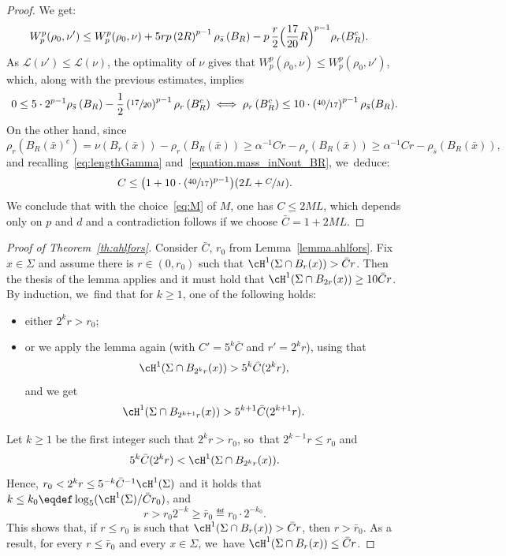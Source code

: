 \begin{proof}
We get:
\begin{align*}
W_p^p(\rho_0, \nu')
&\le
W_p^p(\rho_0, \nu)
+
5rp
\left(2R\right)^{p-1}\rho_{\bar s}\left(B_R\right)
-
p\,\frac{r}{2}
\Bigl(\frac{17}{20}R\Bigr)^{p-1}\rho_r(B_R^c).
\end{align*}
As $\mathcal{L}(\nu') \le \mathcal{L}(\nu)$, the optimality of $\nu$ gives that $W_p^p(\rho_0, \nu) \le W_p^p(\rho_0, \nu')$, which, along with the previous estimates, implies
\[
0 \le
5\cdot
2^{p-1}\rho_{\bar s}\left(B_R\right)
-
\frac{1}{2}
\left(\sfrac{17}{20}\right)^{p-1}\rho_r\left(B_R^c\right)
\iff
\rho_r\left(B_R^c\right)\le 10\cdot \left(\sfrac{40}{17}\right)^{p-1}
\rho_{\bar s}(B_R).
\]
On the other hand, since
\begin{equation*}
\rho_{r}\left(B_R(\bar x)^c\right) = \nu(B_r(\bar x))- \rho_r(B_R(\bar x)) \ge \alpha^{-1}Cr - \rho_r(B_R(\bar x))
\ge \alpha^{-1}Cr - \rho_{\bar s}(B_R(\bar x)),
\end{equation*}
and recalling~\eqref{eq:lengthGamma} and~\eqref{equation.mass_inNout_BR}, we~deduce:
\[
C
\le \bigl( 1+10\cdot(\sfrac{40}{17})^{p-1} \bigr)(2L+\sfrac{C}{M}).
\]
We conclude that with the choice~\eqref{eq:M} of $M$,
one has $C\le 2M L$, which depends only on $p$ and $d$ and a contradiction follows
if we choose $\bar C=1+2M L$.
\end{proof}

\begin{proof}[Proof of Theorem~\ref{th:ahlfors}]
Consider $\bar C$, $r_0$ from Lemma~\ref{lemma.ahlfors}. Fix $x\in \Sigma$ and assume
there is $r\in (0,r_0)$ such that $\cH^1(\Sigma\cap B_r(x)) > \bar Cr$. Then the thesis of the lemma applies and it must hold that $\cH^1(\Sigma\cap B_{2r}(x)) \ge 10\bar Cr$. By induction, we~find that for $k\ge 1$, one of the following holds:
\begin{itemize}
\item either $2^k r > r_0$;
\item or we apply the lemma again (with $C'=5^k\bar C$ and $r'=2^kr$), using that
\[
\cH^1(\Sigma\cap B_{2^{k}r}(x)) > 5^{k}\bar C(2^k r),
\]
and we get
\[
\cH^1(\Sigma\cap B_{2^{k+1}r}(x)) > 5^{k+1}\bar C(2^{k+1}r).
\]
\end{itemize}

Let $k\ge 1$ be the first integer such that $2^k r> r_0$, so~that $2^{k-1}r\le r_0$
and
\[
5^{k}\bar C(2^{k}r) < \cH^1(\Sigma\cap B_{2^{k}r}(x)).
\]
Hence, $r_0 < 2^kr \le 5^{-k}\bar C^{-1}\cH^1(\Sigma)$ and it holds that $k\le k_0\eqdef \log_5 (\cH^1(\Sigma)/\bar C r_0)$,
and
\[
r > r_0 2^{-k} \ge \bar r_0 \eqdef r_0 \cdot 2^{-k_0}.
\]
This shows that, if $r \le r_0$ is such that $\cH^1(\Sigma\cap B_r(x)) > \bar Cr$, then $r>\bar r_0$. As a result, for every $r\le \bar r_0$ and every $x\in\Sigma$, we~have $\cH^1(\Sigma\cap B_r(x))\le \bar Cr$.
\end{proof}

